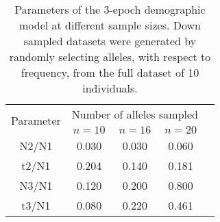 \begin{table}[h!]
\centering
\caption[Parameters of the 3-epoch demographic model at different sample sizes]{Parameters of the 3-epoch demographic model at different sample sizes. Down sampled datasets were generated by randomly selecting alleles, with respect to frequency, from the full dataset of 10 individuals.}
 \begin{tabular}{c c c c c } 

\toprule
\multirow{2}{*}{Parameter} & \multicolumn{3}{c}{Number of alleles sampled} \\ 
	&	$n = 10$ & 	$n = 16$ & 	$n = 20$ \\ \hline
N2/N1 &	0.030 &	0.030 &	0.060 \\
t2/N1 &	0.204 &	0.140 &	0.181 \\
N3/N1 &	0.120 &	0.200 &	0.800 \\
t3/N1 &	0.080 &	0.220 &	0.461 \\
\bottomrule

\end{tabular}
\label{tab:CS3}
\end{table}